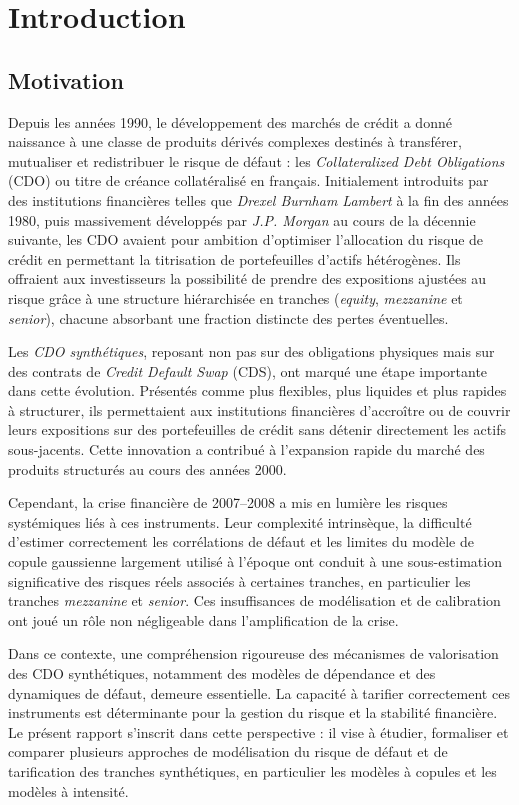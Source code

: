 \section{Introduction}
\subsection{Motivation}

Depuis les années 1990, le développement des marchés de crédit a donné naissance à une classe de produits dérivés complexes destinés à transférer, mutualiser et redistribuer le risque de défaut : les \textit{Collateralized Debt Obligations} (CDO) ou titre de créance collatéralisé en français. Initialement introduits par des institutions financières telles que \textit{Drexel Burnham Lambert} à la fin des années 1980, puis massivement développés par \textit{J.P. Morgan} au cours de la décennie suivante, les CDO avaient pour ambition d’optimiser l’allocation du risque de crédit en permettant la titrisation de portefeuilles d’actifs hétérogènes. Ils offraient aux investisseurs la possibilité de prendre des expositions ajustées au risque grâce à une structure hiérarchisée en tranches (\textit{equity}, \textit{mezzanine} et \textit{senior}), chacune absorbant une fraction distincte des pertes éventuelles.

Les \textit{CDO synthétiques}, reposant non pas sur des obligations physiques mais sur des contrats de \textit{Credit Default Swap} (CDS), ont marqué une étape importante dans cette évolution. Présentés comme plus flexibles, plus liquides et plus rapides à structurer, ils permettaient aux institutions financières d’accroître ou de couvrir leurs expositions sur des portefeuilles de crédit sans détenir directement les actifs sous-jacents. Cette innovation a contribué à l’expansion rapide du marché des produits structurés au cours des années 2000.

Cependant, la crise financière de 2007--2008 a mis en lumière les risques systémiques liés à ces instruments. Leur complexité intrinsèque, la difficulté d’estimer correctement les corrélations de défaut et les limites du modèle de copule gaussienne largement utilisé à l’époque ont conduit à une sous-estimation significative des risques réels associés à certaines tranches, en particulier les tranches \textit{mezzanine} et \textit{senior}. Ces insuffisances de modélisation et de calibration ont joué un rôle non négligeable dans l’amplification de la crise.

Dans ce contexte, une compréhension rigoureuse des mécanismes de valorisation des CDO synthétiques, notamment des modèles de dépendance et des dynamiques de défaut, demeure essentielle. La capacité à tarifier correctement ces instruments est déterminante pour la gestion du risque et la stabilité financière. Le présent rapport s’inscrit dans cette perspective : il vise à étudier, formaliser et comparer plusieurs approches de modélisation du risque de défaut et de tarification des tranches synthétiques, en particulier les modèles à copules et les modèles à intensité.


